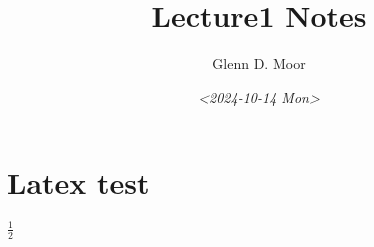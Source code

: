 \documentclass[11pt]{article}
\author{Glenn D. Moor}
\date{\textit{<2024-10-14 Mon>}}
\title{Lecture1 Notes}
\begin{document}
\maketitle
\tableofcontents

\section{Latex test}
\label{sec:org0ceea72}
$\frac{1}{2}$
\end{document}
